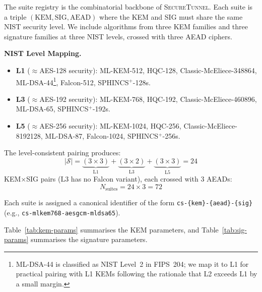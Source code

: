 \documentclass[conference]{IEEEtran}
\newcommand{\sys}{\textsc{SecureTunnel}}
\begin{document}
The suite registry is the combinatorial backbone of \sys{}.
Each suite is a triple $(\mathrm{KEM}, \mathrm{SIG}, \mathrm{AEAD})$ where the KEM and SIG must share the same NIST security level.
We include algorithms from three KEM families and three signature families at three NIST levels, crossed with three AEAD ciphers.

\textbf{NIST Level Mapping.}
\begin{itemize}[noitemsep]
    \item \textbf{L1} ($\approx$AES-128 security): ML-KEM-512, HQC-128, Classic-McEliece-348864, ML-DSA-44\footnote{ML-DSA-44 is classified as NIST Level~2 in FIPS~204; we map it to L1 for practical pairing with L1 KEMs following the rationale that L2 exceeds L1 by a small margin.}, Falcon-512, SPHINCS$^+$-128s.
    \item \textbf{L3} ($\approx$AES-192 security): ML-KEM-768, HQC-192, Classic-McEliece-460896, ML-DSA-65, SPHINCS$^+$-192s.
    \item \textbf{L5} ($\approx$AES-256 security): ML-KEM-1024, HQC-256, Classic-McEliece-8192128, ML-DSA-87, Falcon-1024, SPHINCS$^+$-256s.
\end{itemize}

The level-consistent pairing produces:
\begin{equation}
\label{eq:suite-count}
    |\mathcal{S}| = \underbrace{(3 \times 3)}_{\text{L1}} + \underbrace{(3 \times 2)}_{\text{L3}} + \underbrace{(3 \times 3)}_{\text{L5}} = 24
\end{equation}
KEM$\times$SIG pairs ($\text{L3}$ has no Falcon variant), each crossed with 3 AEADs:
\begin{equation}
    N_{\text{suites}} = 24 \times 3 = 72
\end{equation}

Each suite is assigned a canonical identifier of the form \texttt{cs-\{kem\}-\{aead\}-\{sig\}} (e.g., \texttt{cs-mlkem768-aesgcm-mldsa65}).

Table~\ref{tab:kem-params} summarises the KEM parameters, and Table~\ref{tab:sig-params} summarises the signature parameters.
\end{document}

